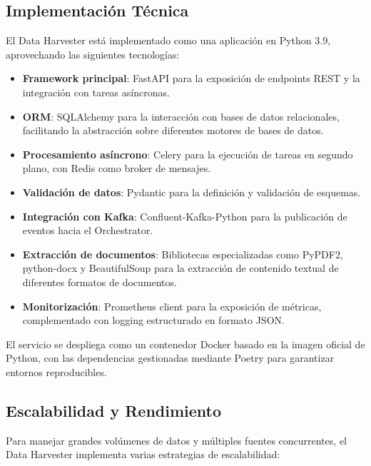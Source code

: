 \documentclass[12pt,a4paper]{article}
\begin{document}
\subsection{Implementación Técnica}
\label{subsec:dh-implementacion}

El Data Harvester está implementado como una aplicación en Python 3.9, aprovechando las siguientes tecnologías:

\begin{itemize}
    \item \textbf{Framework principal}: FastAPI para la exposición de endpoints REST y la integración con tareas asíncronas.
    
    \item \textbf{ORM}: SQLAlchemy para la interacción con bases de datos relacionales, facilitando la abstracción sobre diferentes motores de bases de datos.
    
    \item \textbf{Procesamiento asíncrono}: Celery para la ejecución de tareas en segundo plano, con Redis como broker de mensajes.
    
    \item \textbf{Validación de datos}: Pydantic para la definición y validación de esquemas.
    
    \item \textbf{Integración con Kafka}: Confluent-Kafka-Python para la publicación de eventos hacia el Orchestrator.
    
    \item \textbf{Extracción de documentos}: Bibliotecas especializadas como PyPDF2, python-docx y BeautifulSoup para la extracción de contenido textual de diferentes formatos de documentos.
    
    \item \textbf{Monitorización}: Prometheus client para la exposición de métricas, complementado con logging estructurado en formato JSON.
\end{itemize}

El servicio se despliega como un contenedor Docker basado en la imagen oficial de Python, con las dependencias gestionadas mediante Poetry para garantizar entornos reproducibles.

\subsection{Escalabilidad y Rendimiento}
\label{subsec:dh-escalabilidad}

Para manejar grandes volúmenes de datos y múltiples fuentes concurrentes, el Data Harvester implementa varias estrategias de escalabilidad:
\end{document}
